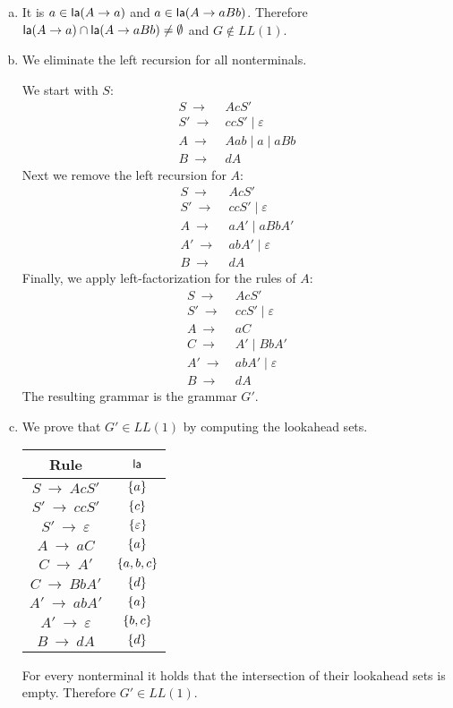 \begin{solution}
\begin{enumerate}[(a)]
\item It is $a \in \textsf{la}(A \to a)$ and $a \in \textsf{la}(A \to aBb)$.
Therefore $\textsf{la}(A \to a) \cap \textsf{la}(A \to aBb) \neq \emptyset$ and $G \not\in LL(1)$.

\item We eliminate the left recursion for all nonterminals.

We start with $S$:
\begin{align*}
    S  ~\to~ & AcS' \\
    S' ~\to~ & ccS' \mid \varepsilon \\
    A  ~\to~ & Aab \mid a \mid aBb \\
    B  ~\to~ & dA
\end{align*}
Next we remove the left recursion for $A$:
\begin{align*}
    S  ~\to~ & AcS' \\
    S' ~\to~ & ccS' \mid \varepsilon \\
    A  ~\to~ & aA' \mid aBbA' \\
    A' ~\to~ & abA' \mid \varepsilon \\
    B  ~\to~ & dA
\end{align*}
Finally, we apply left-factorization for the rules of $A$:
\begin{align*}
    S  ~\to~ & AcS' \\
    S' ~\to~ & ccS' \mid \varepsilon \\
    A  ~\to~ & aC \\
    C  ~\to~ & A' \mid BbA' \\
    A' ~\to~ & abA' \mid \varepsilon \\
    B  ~\to~ & dA
\end{align*}
The resulting grammar is the grammar $G'$.

\item We prove that $G' \in LL(1)$ by computing the lookahead sets.
\begin{center}
\begin{tabular}[h]{c|c}
    Rule & $\textsf{la}$ \\
    \hline \hline
    $S  ~\to~ AcS' $ & $\left\{ a \right\}$ \\
    \hline
    $S' ~\to~ ccS' $ & $\left\{ c \right\}$ \\
    $S' ~\to~ \varepsilon $ & $\left\{ \varepsilon \right\}$ \\
    \hline
    $A  ~\to~ aC $ & $\left\{ a \right\}$ \\
    \hline
    $C  ~\to~ A' $ & $\left\{ a,b,c \right\}$ \\
    $C  ~\to~ BbA' $ & $\left\{ d \right\}$ \\
    \hline
    $A' ~\to~ abA' $ & $\left\{ a \right\}$ \\
    $A' ~\to~ \varepsilon $ & $\left\{ b,c \right\}$ \\
    \hline
    $B  ~\to~ dA$ & $\left\{ d \right\}$
\end{tabular}
\end{center}
For every nonterminal it holds that the intersection of their lookahead sets is empty.
Therefore $G' \in LL(1)$.

\end{enumerate}
\end{solution}

